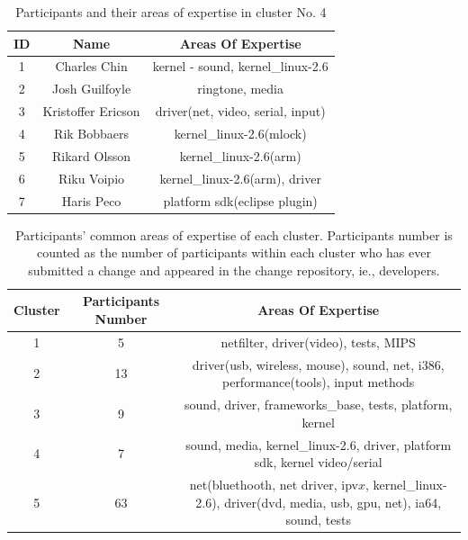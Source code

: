 \documentclass[10pt, conference, compsocconf]{IEEEtran}
\begin{document}
\begin{table}[!t]
\renewcommand{\arraystretch}{1.3}
\caption{Participants and their areas of expertise in cluster No. 4}
\label{cluster_no4}
\centering
\begin{tabular}{|c|c|c|}
\hline
ID & Name & Areas Of Expertise \\
\hline
1 & Charles Chin & kernel - sound, kernel\_linux-2.6 \\
\hline
2 & Josh Guilfoyle & ringtone, media \\
\hline
3 & Kristoffer Ericson & driver(net, video, serial, input) \\
\hline
4 & Rik Bobbaers & kernel\_linux-2.6(mlock) \\
\hline
5 & Rikard Olsson & kernel\_linux-2.6(arm) \\
\hline
6 & Riku Voipio & kernel\_linux-2.6(arm), driver \\
\hline
7 & Haris Peco & platform sdk(eclipse plugin) \\
\hline
\end{tabular}
\end{table}

\begin{table}[!t]
\caption{Participants' common areas of expertise of each cluster. Participants number is counted as the number of participants within each cluster who has ever submitted a change and appeared in the change repository, ie., developers.}
\label{cluster_topic}
\centering
\begin{tabular}{|c|c|c|}
\hline
Cluster & Participants Number & Areas Of Expertise \\
\hline
1 & 5 & netfilter, driver(video), tests, MIPS \\
\hline
2 & 13 & driver(usb, wireless, mouse), sound, net, i386, performance(tools), input methods \\
\hline
3 & 9 & sound, driver, frameworks\_base, tests, platform, kernel \\
\hline
4 & 7 & sound, media, kernel\_linux-2.6, driver, platform sdk, kernel video/serial \\
\hline
5 & 63 & net(bluethooth, net driver, ipv$x$, kernel\_linux-2.6), driver(dvd, media, usb, gpu, net), ia64, sound, tests \\
\hline
\end{tabular}
\end{table}
\end{document}

